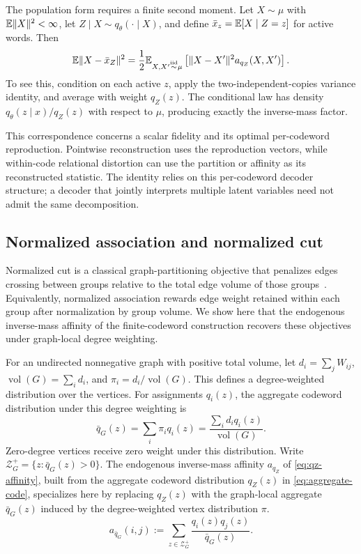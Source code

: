 The population form requires a finite second moment.
Let $X\sim\mu$ with $\mathbb{E}\|X\|^2<\infty$, let $Z\mid X\sim q_\theta(\cdot\mid X)$, and define $\bar x_z=\mathbb{E}[X\mid Z=z]$ for active words.
Then
\begin{equation}
\mathbb{E}\|X-\bar x_Z\|^2
=\frac12\mathbb{E}_{X,X'\overset{\mathrm{iid}}{\sim}\mu}
\left[\|X-X'\|^2a_{q_Z}(X,X')\right].
\label{eq:stochastic-vq-pairwise}
\end{equation}
To see this, condition on each active $z$, apply the two-independent-copies variance identity, and average with weight $q_Z(z)$.
The conditional law has density $q_\theta(z\mid x)/q_Z(z)$ with respect to $\mu$, producing exactly the inverse-mass factor.

This correspondence concerns a scalar fidelity and its optimal per-codeword reproduction.
Pointwise reconstruction uses the reproduction vectors, while within-code relational distortion can use the partition or affinity as its reconstructed statistic.
The identity relies on this per-codeword decoder structure; a decoder that jointly interprets multiple latent variables need not admit the same decomposition.

\subsection{Normalized association and normalized cut}
\label{sec:normalized-cut-realization}

Normalized cut is a classical graph-partitioning objective that penalizes edges crossing between groups relative to the total edge volume of those groups~\citep{shi2000normalized}.
Equivalently, normalized association rewards edge weight retained within each group after normalization by group volume.
We show here that the endogenous inverse-mass affinity of the finite-codeword construction recovers these objectives under graph-local degree weighting.

For an undirected nonnegative graph with positive total volume, let $d_i=\sum_jW_{ij}$, $\operatorname{vol}(G)=\sum_i d_i$, and $\pi_i=d_i/\operatorname{vol}(G)$.
This defines a degree-weighted distribution over the vertices.
For assignments $q_i(z)$, the aggregate codeword distribution under this degree weighting is
\begin{equation}
\bar q_G(z)=\sum_i\pi_iq_i(z)
=\frac{\sum_i d_iq_i(z)}{\operatorname{vol}(G)}.
\label{eq:graph-aggregate-code}
\end{equation}
Zero-degree vertices receive zero weight under this distribution.
Write $\mathcal Z_G^+=\{z:\bar q_G(z)>0\}$.
The endogenous inverse-mass affinity $a_{q_Z}$ of \cref{eq:qz-affinity}, built from the aggregate codeword distribution $q_Z(z)$ in \cref{eq:aggregate-code}, specializes here by replacing $q_Z(z)$ with the graph-local aggregate $\bar q_G(z)$ induced by the degree-weighted vertex distribution $\pi$.
\begin{equation}
a_{\bar q_G}(i,j)
:=\sum_{z\in\mathcal Z_G^+}\frac{q_i(z)q_j(z)}{\bar q_G(z)}.
\end{equation}

